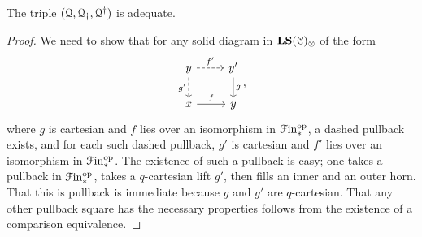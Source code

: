 \documentclass[main.tex]{subfiles}
\begin{document}

\begin{proposition}
  The triple $(\mathcal{Q}, \mathcal{Q}_{\dagger}, \mathcal{Q}^{\dagger})$ is adequate.
\end{proposition}
\begin{proof}
  We need to show that for any solid diagram in $\mathbf{LS}(\mathcal{C})_{\otimes}$ of the form
  \begin{equation*}
    \begin{tikzcd}
      y
      \arrow[r, dashed, "f'"]
      \arrow[d, swap, dashed, "g'"]
      & y'
      \arrow[d, "g"]
      \\
      x
      \arrow[r, "f"]
      & y
    \end{tikzcd},
  \end{equation*}
  where $g$ is cartesian and $f$ lies over an isomorphism in $\mathcal{F}\mathrm{in}_{*}^{\mathrm{op}}$, a dashed pullback exists, and for each such dashed pullback, $g'$ is cartesian and $f'$ lies over an isomorphism in $\mathcal{F}\mathrm{in}_{*}^{\mathrm{op}}$. The existence of such a pullback is easy; one takes a pullback in $\mathcal{F}\mathrm{in}_{*}^{\mathrm{op}}$, takes a $q$-cartesian lift $g'$, then fills an inner and an outer horn. That this is pullback is immediate because $g$ and $g'$ are $q$-cartesian. That any other pullback square has the necessary properties follows from the existence of a comparison equivalence.
\end{proof}
\end{document}
